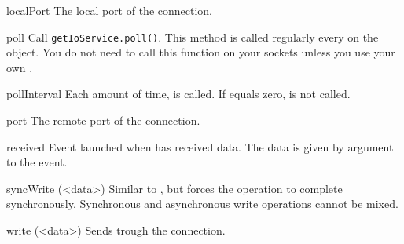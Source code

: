 \begin{urbiscriptapi}
\item[localPort]
  The local port of the connection.


\item[poll] Call \lstinline|getIoService.poll()|. This method is called
  regularly every  on the 
  object. You do not need to call this function on your sockets unless you
  use your own .


\item[pollInterval] Each  amount of time,
   is called. If  equals zero,
   is not called.


\item[port]
  The remote port of the connection.


\item[received]
  Event launched when \this has received data. The data is
  given by argument to the event.


\item[syncWrite](<data>)%
  Similar to , but forces the operation to complete
  synchronously. Synchronous and asynchronous write operations cannot be
  mixed.


\item[write](<data>)%
  Sends  trough the connection.
\end{urbiscriptapi}

